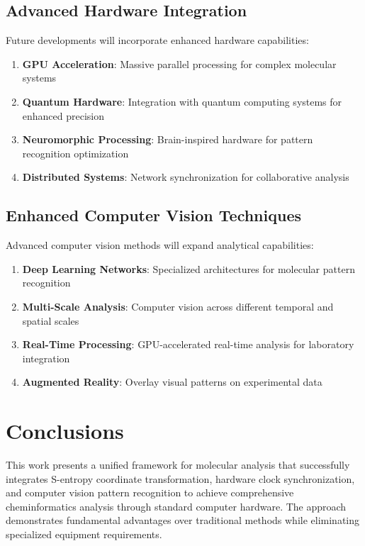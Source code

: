\documentclass[12pt,a4paper]{article}
\begin{document}
\subsection{Advanced Hardware Integration}

Future developments will incorporate enhanced hardware capabilities:

\begin{enumerate}
\item \textbf{GPU Acceleration}: Massive parallel processing for complex molecular systems
\item \textbf{Quantum Hardware}: Integration with quantum computing systems for enhanced precision
\item \textbf{Neuromorphic Processing}: Brain-inspired hardware for pattern recognition optimization
\item \textbf{Distributed Systems}: Network synchronization for collaborative analysis
\end{enumerate}

\subsection{Enhanced Computer Vision Techniques}

Advanced computer vision methods will expand analytical capabilities:

\begin{enumerate}
\item \textbf{Deep Learning Networks}: Specialized architectures for molecular pattern recognition
\item \textbf{Multi-Scale Analysis}: Computer vision across different temporal and spatial scales
\item \textbf{Real-Time Processing}: GPU-accelerated real-time analysis for laboratory integration
\item \textbf{Augmented Reality}: Overlay visual patterns on experimental data
\end{enumerate}

\section{Conclusions}

This work presents a unified framework for molecular analysis that successfully integrates S-entropy coordinate transformation, hardware clock synchronization, and computer vision pattern recognition to achieve comprehensive cheminformatics analysis through standard computer hardware. The approach demonstrates fundamental advantages over traditional methods while eliminating specialized equipment requirements.
\end{document}
